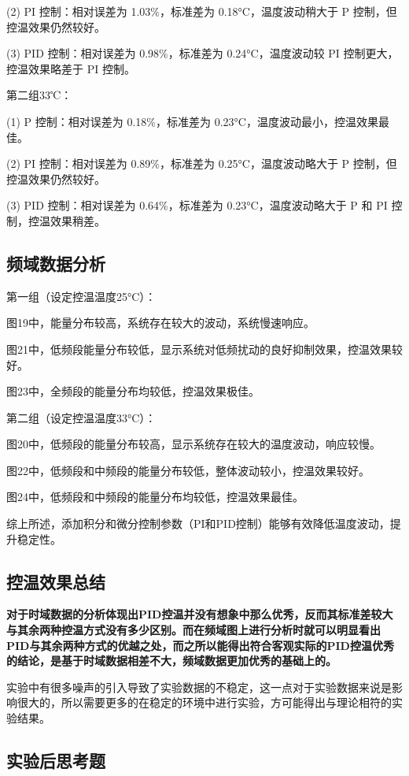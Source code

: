 \documentclass[dvipsnames, svgnames,a4paper,11pt]{article}
\begin{document}
(2) PI 控制：相对误差为 1.03\%，标准差为 0.18°C，温度波动稍大于 P 控制，但控温效果仍然较好。

(3) PID 控制：相对误差为 0.98\%，标准差为 0.24°C，温度波动较 PI 控制更大，控温效果略差于 PI 控制。

第二组33℃：

(1) P 控制：相对误差为 0.18\%，标准差为 0.23°C，温度波动最小，控温效果最佳。

(2) PI 控制：相对误差为 0.89\%，标准差为 0.25°C，温度波动略大于 P 控制，但控温效果仍然较好。

(3) PID 控制：相对误差为 0.64\%，标准差为 0.23°C，温度波动略大于 P 和 PI 控制，控温效果稍差。
\subsection{频域数据分析}


第一组（设定控温温度25°C）：
 
图19中，能量分布较高，系统存在较大的波动，系统慢速响应。
 
 图21中，低频段能量分布较低，显示系统对低频扰动的良好抑制效果，控温效果较好。

 图23中，全频段的能量分布均较低，控温效果极佳。

第二组（设定控温温度33°C）：

	图20中，低频段的能量分布较高，显示系统存在较大的温度波动，响应较慢。

图22中，低频段和中频段的能量分布较低，整体波动较小，控温效果较好。

图24中，低频段和中频段的能量分布均较低，控温效果最佳。

综上所述，添加积分和微分控制参数（PI和PID控制）能够有效降低温度波动，提升稳定性。
\subsection{控温效果总结}
\textbf{对于时域数据的分析体现出PID控温并没有想象中那么优秀，反而其标准差较大与其余两种控温方式没有多少区别。而在频域图上进行分析时就可以明显看出PID与其余两种方式的优越之处，而之所以能得出符合客观实际的PID控温优秀的结论，是基于时域数据相差不大，频域数据更加优秀的基础上的。}


实验中有很多噪声的引入导致了实验数据的不稳定，这一点对于实验数据来说是影响很大的，所以需要更多的在稳定的环境中进行实验，方可能得出与理论相符的实验结果。
	\subsection{实验后思考题}
	
\end{document}
